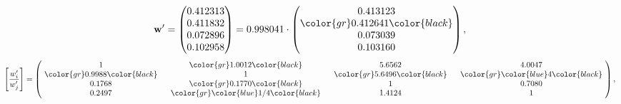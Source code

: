 \begin{example}
\begin{equation*}
\mathbf{w}^{\prime} =
\begin{pmatrix}
0.412313\\
0.411832\\
0.072896\\
0.102958
\end{pmatrix} =
0.998041\cdot
\begin{pmatrix}
0.413123\\
\color{gr} 0.412641\color{black} \\
0.073039\\
0.103160
\end{pmatrix},
\end{equation*}
\begin{equation*}
\left[ \frac{{w}^{\prime}_i}{{w}^{\prime}_j} \right] =
\begin{pmatrix}
$\,\,$ 1 $\,\,$ & $\,\,$\color{gr} 1.0012\color{black} $\,\,$ & $\,\,$5.6562$\,\,$ & $\,\,$4.0047$\,\,$ \\
$\,\,$\color{gr} 0.9988\color{black} $\,\,$ & $\,\,$ 1 $\,\,$ & $\,\,$\color{gr} 5.6496\color{black} $\,\,$ & $\,\,$\color{gr} \color{blue} 4\color{black}   $\,\,$ \\
$\,\,$0.1768$\,\,$ & $\,\,$\color{gr} 0.1770\color{black} $\,\,$ & $\,\,$ 1 $\,\,$ & $\,\,$0.7080 $\,\,$ \\
$\,\,$0.2497$\,\,$ & $\,\,$\color{gr} \color{blue}  1/4\color{black} $\,\,$ & $\,\,$1.4124$\,\,$ & $\,\,$ 1  $\,\,$ \\
\end{pmatrix},
\end{equation*}
\end{example}
\newpage
